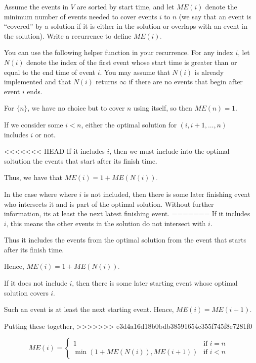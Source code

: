 \begin{questions}
	\question[4] Assume the events in $V$ are sorted by start time, and let $ME(i)$ denote the minimum number of events needed to cover events $i$ to $n$ (we say that an event is ``covered'' by a solution if it is either in the solution or overlaps with an event in the solution). Write a recurrence to define $ME(i)$.

	You can use the following helper function in your recurrence. For any index $i$, let $N(i)$ denote the index of the first event whose start time is greater than or equal to the end time of event $i$. You may assume that $N(i)$ is already implemented and that $N(i)$ returns $\infty$ if there are no events that begin after event $i$ ends.

	\ifsolutions\fi


	\begin{soln}
		For \(\{n\}\), we have no choice but to cover \(n\) using itself, so then \(ME(n) = 1\).

		If we consider some \(i < n\), either the optimal solution for \((i, i + 1, \dots, n)\) includes \(i\) or not.

<<<<<<< HEAD
		If it includes \(i\), then we must include into the optimal soltution the events that start after its finish time.

		Thus, we have that \(ME(i) = 1 + ME(N(i))\).

		In the case where where \(i\) is not included, then there is some later finishing event who intersects it and is part of the optimal solution.
		Without further information, its at least the next latest finishing event.
=======
		If it includes \(i\), this means the other events in the solution do not intersect with \(i\).

		Thus it includes the events from the optimal solution from the event that starts after its finish time.

		Hence, \(ME(i) = 1 + ME(N(i))\).

		If it does not include \(i\), then there is some later starting event whose optimal solution covers \(i\).

		Such an event is at least the next starting event. Hence, \(ME(i) = ME(i + 1)\).

		Putting these together,
>>>>>>> e3d4a16d18b0bdb38591654c355f745f8e7281f0

		\[
			ME(i) = \begin{cases}
				1                              & \text{if } i = n \\
				\min(1 + ME(N(i)),  ME(i + 1)) & \text{if } i < n
			\end{cases}
		\]



\end{soln}
\end{questions}
